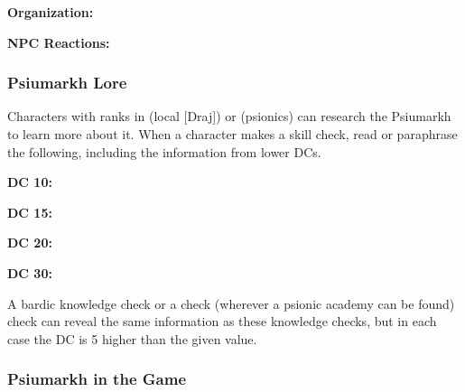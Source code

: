 \textbf{Organization:} 

\textbf{NPC Reactions:} 

\subsubsection{Psiumarkh Lore}
Characters with ranks in  (local [Draj]) or  (psionics) can research the Psiumarkh to learn more about it. When a character makes a skill check, read or paraphrase the following, including the information from lower DCs.

\textbf{DC 10:}

\textbf{DC 15:}

\textbf{DC 20:}

\textbf{DC 30:}

A bardic knowledge check or a  check (wherever a psionic academy can be found) check can reveal the same information as these knowledge checks, but in each case the DC is 5 higher than the given value.

\subsubsection{Psiumarkh in the Game}
